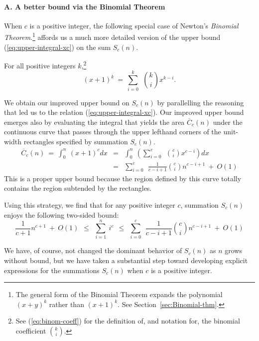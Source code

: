 \paragraph{\sf A. A better bound via the Binomial Theorem}
When $c$ is a positive integer, the following special case of Newton's
{\it Binomial Theorem}.\footnote{The general form of the Binomial
  Theorem expands the polynomial $(x+y)^k$ rather than $(x+1)^k$.  See
Section~\ref{sec:Binomial-thm}.}
affords us a much more detailed version of the upper bound
(\ref{eq:upper-integral-xc})
on the sum $S_c(n)$.

\begin{theorem}
\label{thm:restricted-binomial-thm}
For all positive integers $k$,\footnote{See (\ref{eq:binom-coeff}) for
  the definition of, and notation for, the binomial coefficient
  $\displaystyle {k \choose i}$.}
\[ (x+1)^k \ = \
\sum_{i=0}^k \ \ {k \choose i} x^{k-i}.
\]
\end{theorem}

We obtain our improved upper bound on $S_c(n)$ by parallelling the
reasoning that led us to the relation (\ref{eq:upper-integral-xc}).
Our improved upper bound emerges also by evaluating the integral that
yields the area $\overline{C}_c(n)$ under the continuous curve that
passes through the upper lefthand corners of the unit-width rectangles
specified by summation $S_c(n)$.
\begin{eqnarray}
\label{eq:upper-integral-xk}
\overline{C}_c(n) \ = \
\int_0^n \ (x+1)^c dx & = &
\int_0^n \ \left(
\sum_{i=0}^c \ \ {c \choose i} x^{c-i} \right) dx \\
\nonumber
  & = &
\sum_{i=0}^c \ \ \frac{1}{c-i+1} {c \choose i} n^{c-i+1} \ + \ O(1)
\end{eqnarray}
This is a proper upper bound because the region defined by this curve
totally contains the region subtended by the rectangles.

\noindent
Using this strategy, we find that for any positive integer $c$,
summation $S_c(n)$ enjoys the following two-sided bound:
\begin{equation}
\label{eq:bounds-sum-xk}
\frac{1}{c+1} n^{c+1} \ + \ O(1)
  \ \ \leq \ \ \sum_{i=1}^n \ i^c
  \ \ \leq \ \ 
\sum_{i=0}^c \ \ \frac{1}{c-i+1} {c \choose i} n^{c-i+1} \ + \ O(1)
\end{equation}

We have, of course, not changed the dominant behavior of $S_c(n)$ as
$n$ grows without bound, but we have taken a substantial step toward
developing explicit expressions for the summations $S_c(n)$ when $c$
is a positive integer.

